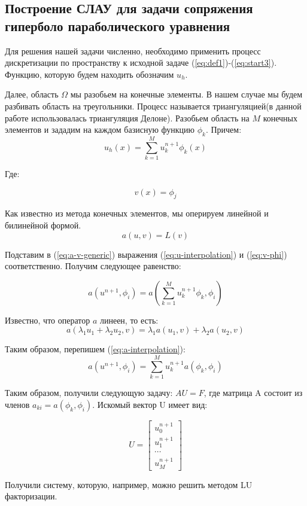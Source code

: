 \subsection{Построение СЛАУ для задачи сопряжения гиперболо параболического уравнения}

Для решения нашей задачи численно, необходимо применить процесс дискретизации по пространству 
к исходной задаче (\ref{eq:def1})-(\ref{eq:start3}). Функцию, которую будем находить обозначим $u_h$.

Далее, область $\Omega$ мы разобьем на конечные элементы. 
В нашем случае мы будем разбивать область на треугольники. Процесс называется триангуляцией(в данной работе использовалась триангуляция Делоне).
Разобьем область на $M$ конечных элементов и зададим на каждом базисную функцию $\phi_k$. Причем:
\begin{equation}
    u_h(x) = \sum_{k=1}^Mu_k^{n+1}\phi_k(x)
    \label{eq:u-interpolation}
\end{equation}

Где:

\begin{equation}
    v(x) = \phi_j
    \label{eq:v-phi}
\end{equation}

Как известно из метода конечных элементов, мы оперируем линейной и билинейной формой. 
\begin{equation}
    a(u, v) = L(v)
    \label{eq:a-v-generic}
\end{equation}

Подставим в (\ref{eq:a-v-generic}) выражения (\ref{eq:u-interpolation}) и (\ref{eq:v-phi}) соответственно. Получим следующее равенство:

\begin{equation}
    a(u^{n+1}, \phi_i) = a(\sum_{k=1}^{M}u_k^{n+1}\phi_k, \phi_i)
    \label{eq:a-interpolation}
\end{equation}

Известно, что оператор $a$ линеен, то есть:
$$ a(\lambda_1u_1 + \lambda_2u_2, v) = \lambda_1a(u_1, v) + \lambda_2a(u_2, v) $$

Таким образом, перепишем (\ref{eq:a-interpolation}):
\begin{equation}
    a(u^{n+1}, \phi_i) = \sum_{k=1}^{M}u_k^{n+1}a(\phi_k, \phi_i)
    \label{a-slau1}
\end{equation}

Таким образом, получили следующую задачу: $AU=F$, где матрица A состоит из членов $a_{ki} = a(\phi_k, \phi_i)$.
Искомый вектор U имеет вид:

$$ U = \begin{bmatrix} u_0^{n+1} \\ u_1^{n+1} \\ \cdots \\ u_M^{n+1} \end{bmatrix} $$

Получили систему, которую, например, можно решить методом LU факторизации.

